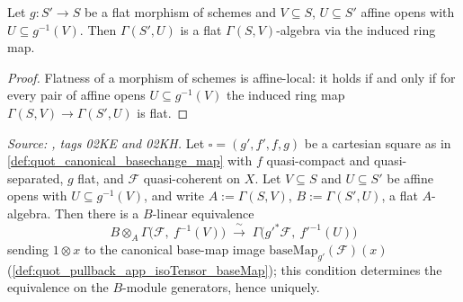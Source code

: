 \begin{lemma}
  \label{lem:quot_flat_gamma_appLE}
  \leanok
  Let \(g : S' \to S\) be a flat morphism of schemes and \(V \subseteq S\),
  \(U \subseteq S'\) affine opens with \(U \subseteq g^{-1}(V)\). Then
  \(\Gamma(S', U)\) is a flat \(\Gamma(S, V)\)-algebra via the induced ring
  map.
\end{lemma}
\begin{proof}\leanok
  Flatness of a morphism of schemes is affine-local: it holds if and only
  if for every pair of affine opens \(U \subseteq g^{-1}(V)\) the induced
  ring map \(\Gamma(S, V) \to \Gamma(S', U)\) is flat.
\end{proof}

\begin{theorem}
  \label{thm:quot_pullback_baseMap_sectionEquiv_qc}
  \leanok
  \textit{Source: \cite{stacks-project}, tags 02KE and 02KH.}
  Let \(\square = (g', f', f, g)\) be a cartesian square as in
  \cref{def:quot_canonical_basechange_map} with \(f\) quasi-compact and
  quasi-separated, \(g\) flat, and \(\mathcal F\) quasi-coherent on \(X\).
  Let \(V \subseteq S\) and \(U \subseteq S'\) be affine opens with
  \(U \subseteq g^{-1}(V)\), and write \(A := \Gamma(S, V)\),
  \(B := \Gamma(S', U)\), a flat \(A\)-algebra. Then there is a
  \(B\)-linear equivalence
  \[
    B \otimes_A \Gamma\bigl(\mathcal F,\ f^{-1}(V)\bigr)
    \;\xrightarrow{\ \sim\ }\;
    \Gamma\bigl(g'^* \mathcal F,\ f'^{-1}(U)\bigr)
  \]
  sending \(1 \otimes x\) to the canonical base-map image
  \(\mathrm{baseMap}_{g'}(\mathcal F)(x)\)
  (\cref{def:quot_pullback_app_isoTensor_baseMap}); this condition
  determines the equivalence on the \(B\)-module generators, hence
  uniquely.
\end{theorem}
